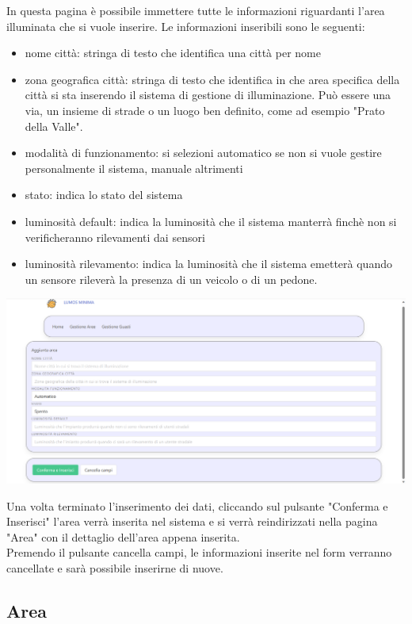 \documentclass[9pt]{article}
\begin{document}
In questa pagina è possibile immettere tutte le informazioni riguardanti l'area illuminata che si vuole inserire.
Le informazioni inseribili sono le seguenti:
\begin{itemize}
	\item nome città: stringa di testo che identifica una città per nome
	\item zona geografica città: stringa di testo che identifica in che area specifica della città si sta inserendo il sistema di gestione di illuminazione. Può essere una via, un insieme di strade o un luogo ben definito, come ad esempio "Prato della Valle".
	\item modalità di funzionamento: si selezioni automatico se non si vuole gestire personalmente il sistema, manuale altrimenti
	\item stato: indica lo stato del sistema
	\item luminosità default: indica la luminosità che il sistema manterrà finchè non si verificheranno rilevamenti dai sensori
	\item luminosità rilevamento: indica la luminosità che il sistema emetterà quando un sensore rileverà la presenza di un veicolo o di un pedone.
\end{itemize}


\begin{center}
	\includegraphics[scale=0.3]{Aggiungi_area.png}
\end{center}

Una volta terminato l'inserimento dei dati, cliccando sul pulsante "Conferma e Inserisci"
l'area verrà inserita nel sistema e si verrà reindirizzati nella pagina "Area" con il dettaglio dell'area appena inserita.\\
Premendo il pulsante cancella campi, le informazioni inserite nel form verranno cancellate e sarà possibile inserirne di nuove.
\subsection{Area}
\end{document}
